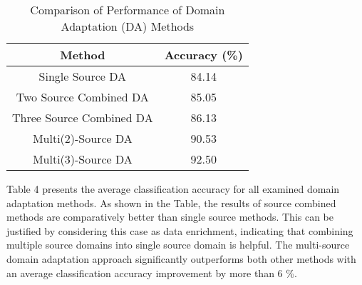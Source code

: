 \documentclass[journal,article,accept,moreauthors,pdftex]{Definitions/mdpi}
\begin{document}
\begin{table}[!t]
\caption{Comparison of Performance of Domain Adaptation (DA) Methods }
\label{table:da}
\centering
\begin{tabular}{|c|c|}
\hline 
Method & Accuracy (\%) \\
\hline \hline
Single Source DA & 84.14\\
Two Source Combined DA  & 85.05\\
Three Source Combined DA &  86.13\\
Multi(2)-Source DA & 90.53\\
Multi(3)-Source DA & 92.50\\
\hline 
\end{tabular}
\end{table}

Table 4 presents the average classification accuracy for all examined domain adaptation methods. 
As shown in the Table, the results of source combined methods are
comparatively better than single source methods. This can be justified by considering this case as data enrichment, indicating
that combining multiple source domains into single source
domain is helpful. The multi-source
domain adaptation approach significantly outperforms both other methods with an average classification accuracy improvement by
more than 6 \%. 








\end{document}
